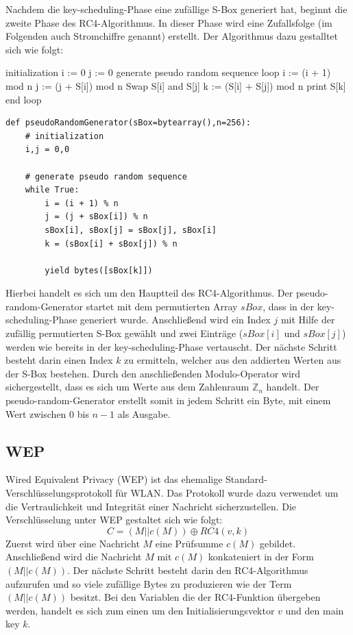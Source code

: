 \documentclass[10pt,a4paper]{article}
\begin{document}
Nachdem die key-scheduling-Phase eine zufällige S-Box generiert hat, beginnt die zweite Phase des RC4-Algorithmus. In dieser Phase wird eine Zufallsfolge (im Folgenden auch Stromchiffre genannt) erstellt. Der Algorithmus dazu gestalltet sich wie folgt:
\begin{center}
\hspace{5pt}
\begin{minipage}[t]{.35\textwidth}
\begin{algorithm}
{initialization}
i := 0
j := 0
{generate pseudo random sequence}
loop
    i := (i + 1) mod n
    j := (j + S[i]) mod n
    Swap S[i] and S[j]
    k := (S[i] + S[j]) mod n
    print S[k]
end loop
\end{algorithm}
\end{minipage}\hspace{0.4cm}
\begin{minipage}[t]{.60\textwidth}
\begin{lstlisting}
def pseudoRandomGenerator(sBox=bytearray(),n=256):
   	# initialization
	i,j = 0,0

	# generate pseudo random sequence
	while True:
   		i = (i + 1) % n
   		j = (j + sBox[i]) % n
   		sBox[i], sBox[j] = sBox[j], sBox[i]
   		k = (sBox[i] + sBox[j]) % n

   		yield bytes([sBox[k]])
\end{lstlisting}
\end{minipage}
\end{center}
Hierbei handelt es sich um den Hauptteil des RC4-Algorithmus.  Der pseudo-random-Generator startet mit dem permutierten Array $sBox$, dass in der key-scheduling-Phase generiert wurde. Anschließend wird ein Index $j$ mit Hilfe der zufällig permutierten S-Box gewählt und zwei Einträge ($sBox[i]$ und $sBox[j]$) werden wie bereits in der key-scheduling-Phase vertauscht. Der nächste Schritt besteht darin einen Index $k$ zu ermitteln, welcher aus den addierten Werten aus der S-Box bestehen. Durch den anschließenden Modulo-Operator wird sichergestellt, dass es sich um Werte aus dem Zahlenraum $\mathbb{Z}_n$ handelt. Der pseudo-random-Generator erstellt somit in jedem Schritt ein Byte, mit einem Wert zwischen $0$ bis $n-1$ als Ausgabe.

\subsection{WEP}
Wired Equivalent Privacy (WEP) ist das ehemalige Standard-Verschlüsselungsprotokoll für WLAN. Das Protokoll wurde dazu verwendet um die Vertraulichkeit und Integrität einer Nachricht sicherzustellen. Die Verschlüsselung unter WEP gestaltet sich wie folgt:
$$
C = (M || c(M)) \oplus RC4(v,k)
$$
Zuerst wird über eine Nachricht $M$ eine Prüfsumme $c(M)$ gebildet. Anschließend wird die Nachricht $M$ mit $c(M)$ konkateniert in der Form $(M || c(M))$. Der nächste Schritt besteht darin den RC4-Algorithmus aufzurufen und so viele zufällige Bytes zu produzieren wie der Term $(M || c(M))$ besitzt. Bei den Variablen die der RC4-Funktion übergeben werden, handelt es sich zum einen um den Initialisierungsvektor $v$ und den main key $k$.
\end{document}
